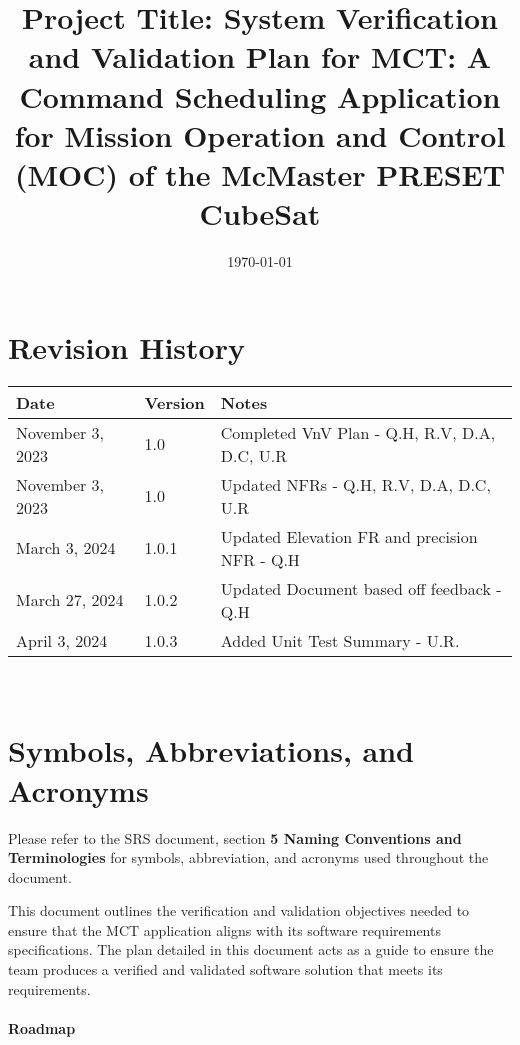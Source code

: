 \documentclass[12pt, titlepage]{article}
\begin{document}
\title{Project Title: System Verification and Validation Plan for MCT: A Command Scheduling Application for Mission Operation and Control (MOC) of the McMaster PRESET CubeSat}
\author{\authname}
\date{\today}
	
\maketitle


\section*{Revision History}

\begin{tabularx}{\textwidth}{p{3cm}p{2cm}X}
\toprule {\bf Date} & {\bf Version} & {\bf Notes}\\
\midrule
November 3, 2023 & 1.0 & Completed VnV Plan - Q.H, R.V, D.A, D.C, U.R\\

November 3, 2023 & 1.0 & Updated NFRs - Q.H, R.V, D.A, D.C, U.R\\
March 3, 2024 & 1.0.1 & Updated Elevation FR and precision NFR - Q.H\\
March 27, 2024 & 1.0.2 & Updated Document based off feedback - Q.H\\
April 3, 2024 & 1.0.3 & Added Unit Test Summary - U.R.\\

\bottomrule
\end{tabularx}

~\\

\newpage

\tableofcontents

\newpage

\section{Symbols, Abbreviations, and Acronyms}

Please refer to the SRS document, section \textbf{5 Naming Conventions and Terminologies} for symbols, abbreviation, and acronyms used throughout the document.


This document outlines the verification and validation objectives needed to ensure that the MCT application aligns with its software requirements specifications. The plan detailed in this document acts as a guide to ensure the team produces a verified and validated software solution that meets its requirements. 
\\\\
\textbf{Roadmap}
\end{document}
